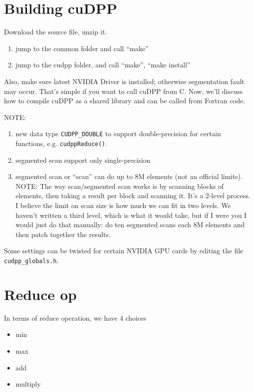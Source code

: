 \section{Building cuDPP}
\label{sec:building-cudpp}

Download the source file, unzip it.
\begin{enumerate}
\item jump to the common folder and call ``make''
\item jump to the cudpp folder, and call ``make'', ``make install''
\end{enumerate}
Also, make sure latest NVIDIA Driver is installed; otherwise
segmentation fault may occur.  That's simple if you want to call cuDPP
from C. Now, we'll discuss how to compile cuDPP as a shared library
and can be called from Fortran code.

NOTE:
\begin{enumerate}
\item new data type \verb!CUDPP_DOUBLE! to support double-precision
  for certain functions, e.g. \verb!cudppReduce()!. 
\item segmented scan support only single-precision
\item segmented scan or ``scan'' can do up to 8M elements (not an
  official limits). NOTE: The way scan/segmented scan works is by
  scanning blocks of elements, then taking a result per block and
  scanning it. It's a 2-level process. I believe the limit on scan
  size is how much we can fit in two levels. We haven't written a
  third level, which is what it would take, but if I were you I would
  just do that manually: do ten segmented scans each 8M elements and
  then patch together the results.
\end{enumerate}

Some settings can be twisted for certain NVIDIA GPU cards by editing
the file \verb!cudpp_globals.h!. 

\section{Reduce op}
\label{sec:reduce-op}

In terms of reduce operation, we have 4 choices
\begin{itemize}
\item min 
\item max
\item add
\item multiply
\end{itemize}




